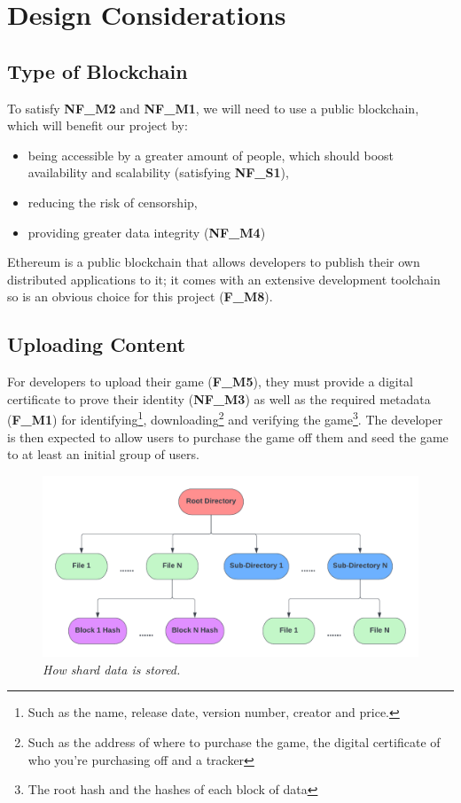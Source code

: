 
\section{Design Considerations}

\subsection*{Type of Blockchain}

To satisfy \textbf{NF\_M2} and \textbf{NF\_M1}, we will need to use a public blockchain, which will benefit our project by:

\begin{itemize}
  \item being accessible by a greater amount of people, which should boost availability and scalability (satisfying \textbf{NF\_S1}),
  \item reducing the risk of censorship,
  \item providing greater data integrity (\textbf{NF\_M4})
\end{itemize}

\noindent Ethereum is a public blockchain that allows developers to publish their own distributed applications to it; it comes with an extensive development toolchain so is an obvious choice for this project (\textbf{F\_M8}).


\subsection*{Uploading Content}
\label{subsec:upload-content}

For developers to upload their game (\textbf{F\_M5}), they must provide a digital certificate to prove their identity (\textbf{NF\_M3}) as well as the required metadata (\textbf{F\_M1}) for identifying\footnote{Such as the name, release date, version number, creator and price.}, downloading\footnote{Such as the address of where to purchase the game, the digital certificate of who you're purchasing off and a tracker} and verifying the game\footnote{The root hash and the hashes of each block of data}. The developer is then expected to allow users to purchase the game off them and seed the game to at least an initial group of users.

\begin{figure}[ht]
  \centering
  \includegraphics[width=.85\textwidth]{images/diagrams/block-body.png}
  \caption{\textit{How shard data is stored.}}
  \label{fig:hash-storage}
\end{figure}

